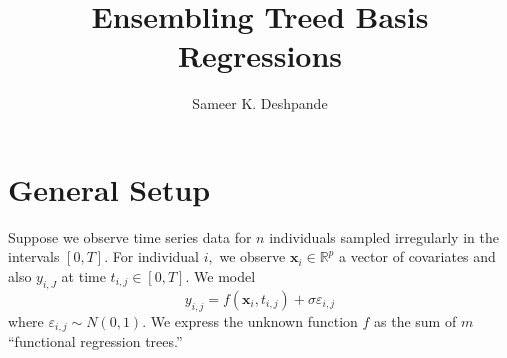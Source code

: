 \documentclass[12pt]{article}
\title{Ensembling Treed Basis Regressions}
\author{Sameer K. Deshpande}
\begin{document}
\maketitle
\def\C{\mathbb{C}}
\def\R{\mathbb{R}}
\def\Q{\mathbb{Q}}
\def\Z{\mathbb{Z}}
\def\N{\text{N}}
\def\P{\mathbb{P}}
\def\E{\mathbb{E}}
\def\by{\mathbf{y}}
\def\bx{\mathbf{x}}
\def\bz{\mathbf{z}}
\def\bw{\mathbf{w}}
\def\br{\mathbf{r}}
\def\bu{\mathbf{u}}
\def\bY{\mathbf{Y}}
\def\bX{\mathbf{X}}
\def\bf{\mathbf{f}}
\def\bgamma{\boldsymbol{\gamma}}
\def\bSigma{\boldsymbol{\Sigma}}
\def\bsigma{\boldsymbol{\sigma}}
\def\bmu{\boldsymbol{\mu}}
\def\btheta{\boldsymbol{\theta}}

\def\M{\mathcal{M}}
\def\T{\mathcal{T}}
\def\tilT{\tilde{T}}


\section{General Setup}
\label{sec:introduction}

Suppose we observe time series data for $n$ individuals sampled irregularly in the intervals $[0,T].$
For individual $i,$ we observe $\bx_{i} \in \R^{p}$ a vector of covariates and also $y_{i,J}$ at time $t_{i,j} \in [0,T].$
We model
$$
y_{i,j} = f(\bx_{i}, t_{i,j}) + \sigma \varepsilon_{i,j}
$$
where $\varepsilon_{i,j} \sim N(0,1).$
We express the unknown function $f$ as the sum of $m$ ``functional regression trees.''
\end{document}
